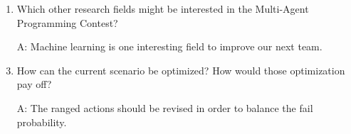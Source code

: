 \begin{enumerate}
	
\item Which other research fields might be interested in the Multi-Agent Programming Contest?
	\item[A:] Machine learning is one interesting field to improve our next team. \\
	
	
\item How can the current scenario be optimized? How would those optimization pay off?
	\item[A:] The ranged actions should be revised in order to balance the fail probability.\\
	
\end{enumerate}
